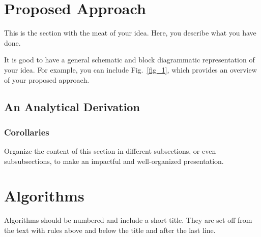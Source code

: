 \documentclass[lettersize,journal]{IEEEtran}
\begin{document}
\section{Proposed Approach}

This is the section with the meat of your idea. Here, you describe what you have done. 

It is good to have a general schematic and block diagrammatic representation of your idea. For example, you can include Fig.~\ref{fig_1}, which provides an overview of your proposed approach.


\subsection{An Analytical Derivation}

\subsubsection{Corollaries}

Organize the content of this section in different subsections, or even subsubsections, to make an impactful and well-organized presentation.

\section{Algorithms}
Algorithms should be numbered and include a short title. They are set off from the text with rules above and below the title and after the last line.
\end{document}
